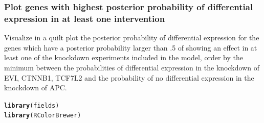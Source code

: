 \documentclass[a4paper]{article}\usepackage[]{graphicx}\usepackage[]{color}
\makeatletter
\newcommand{\hlstd}[1]{\textcolor[rgb]{0.345,0.345,0.345}{#1}}%
\newcommand{\hlkwd}[1]{\textcolor[rgb]{0.737,0.353,0.396}{\textbf{#1}}}%
\newenvironment{kframe}{%
 \def\at@end@of@kframe{}%
 \ifinner\ifhmode%
  \def\at@end@of@kframe{\end{minipage}}%
  \begin{minipage}{\columnwidth}%
 \fi\fi%
 \def\FrameCommand##1{\hskip\@totalleftmargin \hskip-\fboxsep
 \colorbox{shadecolor}{##1}\hskip-\fboxsep
     \hskip-\linewidth \hskip-\@totalleftmargin \hskip\columnwidth}%
 \MakeFramed {\advance\hsize-\width
   \@totalleftmargin\z@ \linewidth\hsize
   \@setminipage}}%
 {\par\unskip\endMakeFramed%
 \at@end@of@kframe}
\newenvironment{knitrout}{}{} %
\makeatother
\begin{document}

\subsubsection*{Plot genes with highest posterior probability of differential expression in at least one intervention}
Visualize in a quilt plot the posterior probability of differential expression for the genes which have a posterior probability larger than .5 of showing an effect in at least one of the knockdown experiments included in the model, order by the minimum between the probabilities of differential expression in the knockdown of EVI, CTNNB1, TCF7L2 and the probability of no differential expression in the knockdown of APC.

\begin{knitrout}
\color{fgcolor}\begin{kframe}
\begin{alltt}
\hlkwd{library}\hlstd{(fields)}
\hlkwd{library}\hlstd{(RColorBrewer)}
\end{alltt}
\end{kframe}
\end{knitrout}
\end{document}

